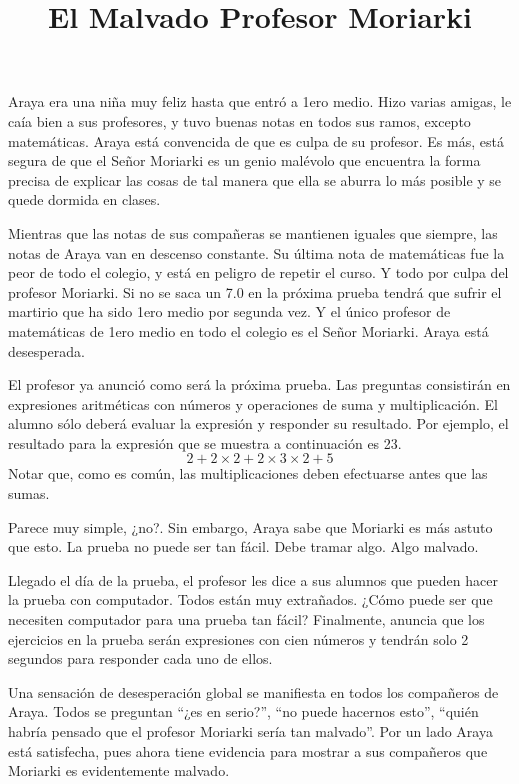 \documentclass{oci}
\title{El Malvado Profesor Moriarki}
\begin{document}
\begin{problemDescription}
Araya era una niña muy feliz hasta que entró a 1ero medio.
Hizo varias amigas, le caía bien a sus profesores, y tuvo buenas notas en todos sus ramos, excepto matemáticas. Araya está convencida de que es culpa de su profesor. Es más, está segura de que el Señor Moriarki es un genio malévolo que encuentra la forma precisa de explicar las cosas de tal manera que ella se aburra lo más posible y se quede dormida en clases.

Mientras que las notas de sus compañeras se mantienen iguales que siempre, las notas de Araya van en descenso constante. Su última nota de matemáticas fue la peor de todo el colegio, y está en peligro de repetir el curso. Y todo por culpa del profesor Moriarki. Si no se saca un 7.0 en la próxima prueba tendrá que sufrir el martirio que ha sido 1ero medio por segunda vez. Y el único profesor de matemáticas de 1ero medio en todo el colegio es el Señor Moriarki. Araya está desesperada.

El profesor ya anunció como será la próxima prueba.
Las preguntas consistirán en expresiones aritméticas con números y operaciones
de suma y multiplicación.
El alumno sólo deberá evaluar la expresión y responder su resultado.
Por ejemplo, el resultado para la expresión que se muestra a continuación es 23.
$$
2 + 2 \times 2 + 2\times 3 \times 2 + 5
$$
Notar que, como es común, las multiplicaciones deben efectuarse antes que las sumas.

Parece muy simple, ¿no?.
Sin embargo, Araya sabe que Moriarki es más astuto que esto.
La prueba no puede ser tan fácil.
Debe tramar algo.
Algo malvado.

Llegado el día de la prueba, el profesor les dice a sus alumnos que pueden hacer
la prueba con computador.
Todos están muy extrañados.
¿Cómo puede ser que necesiten computador para una prueba tan fácil?
Finalmente, anuncia que los ejercicios en la prueba serán expresiones con cien
números y tendrán solo 2 segundos para responder cada uno de ellos.

Una sensación de desesperación global se manifiesta en todos los compañeros de
Araya.
Todos se preguntan ``¿es en serio?'', ``no puede hacernos esto'', ``quién
habría pensado que el profesor Moriarki sería tan malvado''.
Por un lado Araya está satisfecha, pues ahora tiene evidencia para mostrar a sus
compañeros que Moriarki es evidentemente malvado.


\end{problemDescription}
\end{document}
